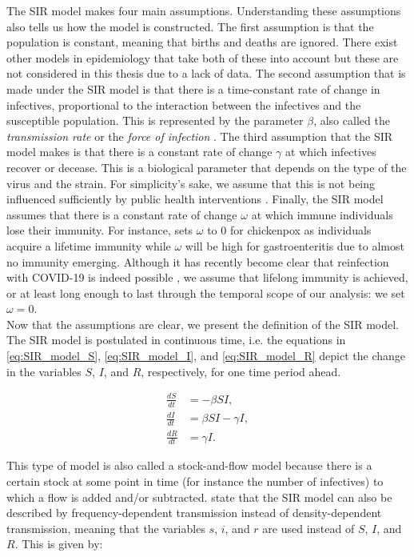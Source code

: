 \documentclass[12pt]{article}
\begin{document}
	The SIR model makes four main assumptions. Understanding these assumptions also tells us how the model is constructed. The first assumption is that the population is constant, meaning that births and deaths are ignored. There exist other models in epidemiology that take both of these into account but these are not considered in this thesis due to a lack of data. The second assumption that is made under the SIR model is that there is a time-constant rate of change in infectives, proportional to the interaction between the infectives and the susceptible population. This is represented by the parameter $\beta$, also called the \textit{transmission rate} or the \textit{force of infection} \parencite{keeling2011modeling}. The third assumption that the SIR model makes is that there is a constant rate of change $\gamma$ at which infectives recover or decease. This is a biological parameter that depends on the type of the virus and the strain. For simplicity's sake, we assume that this is not being influenced sufficiently by public health interventions \parencite{adda2016economic}. Finally, the SIR model assumes that there is a constant rate of change $\omega$ at which immune individuals lose their immunity. For instance, \textcite{adda2016economic} sets $\omega$ to 0 for chickenpox as individuals acquire a lifetime immunity while $\omega$ will be high for gastroenteritis due to almost no immunity emerging. Although it has recently become clear that reinfection with COVID-19 is indeed possible \parencite{bloomberg2020reinfection}, we assume that lifelong immunity is achieved, or at least long enough to last through the temporal scope of our analysis: we set $\omega = 0$. \\
	
	Now that the assumptions are clear, we present the definition of the SIR model. The SIR model is postulated in continuous time, i.e. the equations in \eqref{eq:SIR_model_S}, \eqref{eq:SIR_model_I}, and \eqref{eq:SIR_model_R} depict the change in the variables $S$, $I$, and $R$, respectively, for one time period ahead.
	
	\begin{align}
    	\frac{dS}{dt} &= -\beta SI, \label{eq:SIR_model_S}\\
    	\frac{dI}{dt} &= \beta SI - \gamma I, \label{eq:SIR_model_I}\\
    	\frac{dR}{dt} &= \gamma I. \label{eq:SIR_model_R}
	\end{align}
	
	This type of model is also called a stock-and-flow model because there is a certain stock at some point in time (for instance the number of infectives) to which a flow is added and/or subtracted. \textcite{keeling2011modeling} state that the SIR model can also be described by frequency-dependent transmission instead of density-dependent transmission, meaning that the variables $s$, $i$, and $r$ are used instead of $S$, $I$, and $R$. This is given by:
	
\end{document}
